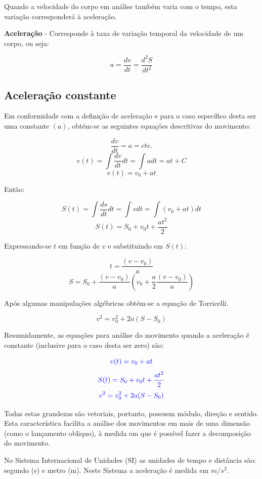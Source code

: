 \documentclass[
    12pt, %
    openright,
    twoside, %
    a4paper, %
    article,
    english,brazil %
]{abntex2}
\begin{document}
Quando a velocidade do corpo em análise também varia com o tempo, esta variação corresponderá à aceleração.

\textbf{Aceleração} - Corresponde à taxa de variação temporal da velocidade de um corpo, ou seja:

$$ a = \frac{dv}{dt} = \frac{d^2S}{dt^2}$$

\subsection{Aceleração constante}

Em conformidade com a definição de aceleração e para o caso específico desta ser uma constante $(a)$, obtém-se as seguintes equações descritivas do movimento:

$$ \frac{dv}{dt} = a = cte. $$
$$ v(t) = \int \frac{dv}{dt} dt = \int a dt = at + C $$
$$ v(t) = v_0 + at $$

Então:

$$ S(t) = \int \frac{ds}{dt} dt = \int v dt = \int (v_0 + at) dt $$
$$ S(t) = S_0 + v_0 t + \frac{a t^2}{2} $$

Expressando-se $t$ em função de $v$ e substituindo em $S(t)$:

$$t = \frac{(v - v_0)}{a}$$
$$S = S_0 + \frac{(v - v_0)}{a}(v_0 + \frac{a}{2}\frac{(v - v_0)}{a})$$

Após algumas manipulações algébricas obtém-se a equação de Torricelli. 

$$v^2 = v_0^2 + 2a(S-S_0)$$

Resumidamente, as equações para análise do movimento quando a aceleração é constante (inclusive para o caso desta ser zero) são:

\begin{equation}
    \color{blue}
    v(t) = v_0 + at
\end{equation}
\begin{equation}
    \color{blue}
    S(t) = S_0 + v_0t + \frac{at^2}{2}    
\end{equation}
\begin{equation}
    \color{blue}
    v^2 = v_0^2 + 2a(S - S_0)
\end{equation}

Todas estas grandezas são vetoriais, portanto, possuem módulo, direção e sentido. Esta característica facilita a análise dos movimentos em mais de uma dimensão (como o lançamento obliquo), à medida em que é possível fazer a decomposição do movimento.

No Sistema Internacional de Unidades (SI) as unidades de tempo e distância são: segundo (s) e metro (m). Neste Sistema a aceleração é medida em $m/s^2$.
\end{document}
